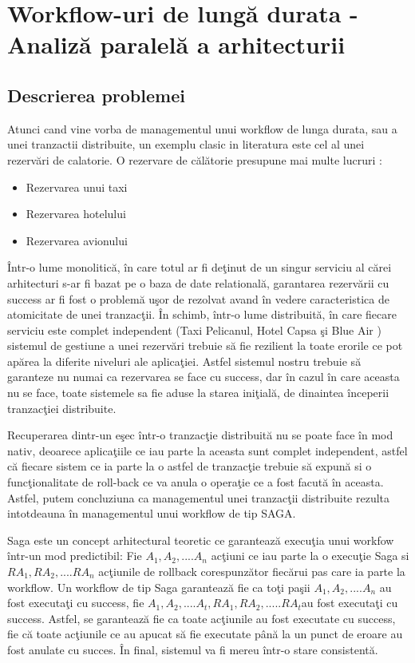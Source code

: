 \chapter{Workflow-uri de lungă durata - Analiză paralelă a arhitecturii}
\section{Descrierea problemei}
\quad Atunci cand vine vorba de managementul unui workflow de lunga durata, sau a unei tranzactii distribuite, un exemplu clasic in literatura este cel al unei rezervări de calatorie. O rezervare de călătorie presupune mai multe lucruri : 
\begin{itemize}
\item Rezervarea unui taxi
\item Rezervarea hotelului
\item Rezervarea avionului
\end{itemize}
\par Într-o lume monolitică, în care totul ar fi deţinut de un singur serviciu al cărei arhitecturi s-ar fi bazat pe o baza de date relatională, garantarea rezervării cu success ar fi fost o problemă uşor de rezolvat avand în vedere caracteristica de atomicitate de unei tranzacţii. În schimb, într-o lume distribuită, în care fiecare serviciu este complet independent (Taxi Pelicanul, Hotel Capsa şi Blue Air ) sistemul de gestiune a unei rezervări trebuie să fie rezilient la toate erorile ce pot apărea la diferite niveluri ale aplicaţiei. Astfel sistemul nostru trebuie să garanteze nu numai ca rezervarea se face cu success, dar în cazul în care aceasta nu se face, toate sistemele sa fie aduse la starea iniţială, de dinaintea începerii tranzacţiei distribuite.
\par Recuperarea dintr-un eşec într-o tranzacţie distribuită nu se poate face în mod nativ, deoarece aplicaţiile ce iau parte la aceasta sunt complet independent, astfel că fiecare sistem ce ia parte la o astfel de tranzacţie trebuie să expună si o funcţionalitate de roll-back ce va anula o operaţie ce a fost facută în aceasta. Astfel, putem concluziuna ca managementul unei tranzacţii distribuite rezulta intotdeauna în managementul unui workflow de tip SAGA. 
\par Saga este un concept arhitectural teoretic ce garantează execuţia unui workfow într-un mod predictibil: Fie \(A_{1}, A_{2}, .... A_{n}\) acţiuni ce iau parte la o execuţie Saga si \(RA_{1}, RA_{2}, .... RA_{n}\) acţiunile de rollback corespunzător fiecărui pas care ia parte la workflow. Un workflow de tip Saga garantează fie ca toţi paşii \(A_{1}, A_{2}, .... A_{n}\) au fost executaţi cu success, fie \(A_{1}, A_{2}, .... A_{t} , RA_{1}, RA_{2}, ..... RA_{t}\)au fost executaţi cu success. Astfel, se garantează fie ca toate acţiunile au fost executate cu success, fie că toate acţiunile ce au apucat să fie executate până la un punct de eroare au fost anulate cu succes. În final, sistemul va fi mereu într-o stare consistentă. 
